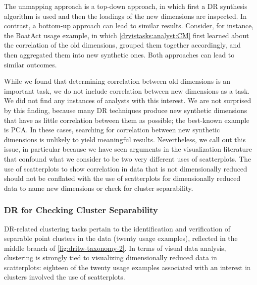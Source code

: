 The unmapping approach is a top-down approach, in which first a \ac{DR} synthesis algorithm is used and then the loadings of the new dimensions are inspected. 
In contrast, a bottom-up approach can lead to similar results. 
Consider, for instance, the {\sc BoatAct} usage example, in which \ref{drvistasks:analyst:CM} first learned about the correlation of the old dimensions, grouped them together accordingly, and then aggregated them into new synthetic ones. 
Both approaches can lead to similar outcomes. 

While we found that determining correlation between old dimensions is an important task, we do not include correlation between new dimensions as a task. 
We did not find any instances of analysts with this interest. 
We are not surprised by this finding, because many \ac{DR} techniques produce new synthetic dimensions that have as little correlation between them as possible; the best-known example is \ac{PCA}.
In these cases, searching for correlation between new synthetic dimensions is unlikely to yield meaningful results. 
Nevertheless, we call out this issue, in particular because we have seen arguments in the visualization literature that confound what we consider to be two very different uses of scatterplots. 
The use of scatterplots to show correlation in data that is not dimensionally reduced should not be conflated with the use of scatterplots for dimensionally reduced data to name new dimensions or check for cluster separability. 


\subsubsection{DR for Checking Cluster Separability}
\label{app:drvistasks:dritw:taxonomy:clusters}


\ac{DR}-related clustering tasks pertain to the identification and verification of separable point clusters in the data (twenty usage examples), reflected in the middle branch of \autoref{fig:dritw-taxonomy-2}. 
In terms of visual data analysis, clustering is strongly tied to visualizing dimensionally reduced data in scatterplots: eighteen of the twenty usage examples associated with an interest in clusters involved the use of scatterplots.


